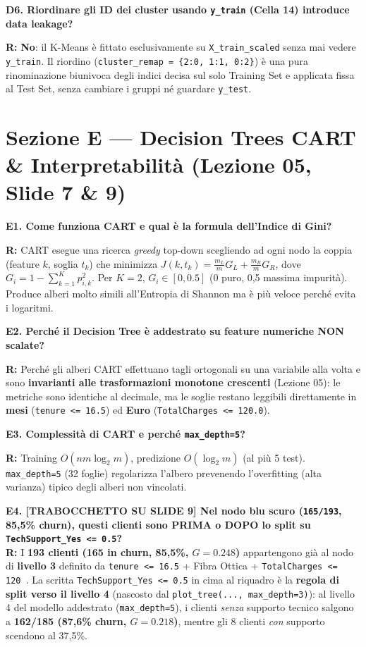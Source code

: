 \documentclass[10pt, a4paper]{article}
\newcommand{\qa}[2]{%
  \par\vspace{4pt}\noindent\textbf{\color{PrimaryNavy}#1}\par\vspace{1pt}%
  \noindent\textbf{\color{SecondaryBlue}R:} #2\par\vspace{2pt}%
}
\newcommand{\qatrap}[2]{%
  \par\vspace{4pt}\noindent\colorbox{TrapBg}{\parbox{\dimexpr\linewidth-2\fboxsep}{%
  \textbf{\color{AccentRed}#1}\\[2pt]\textbf{\color{PrimaryNavy}R:} #2}}\par\vspace{3pt}%
}
\begin{document}
\qa{D6. Riordinare gli ID dei cluster usando \texttt{y\_train} (Cella 14) introduce data leakage?}{
\textbf{No}: il K-Means è fittato esclusivamente su \texttt{X\_train\_scaled} senza mai vedere \texttt{y\_train}. Il riordino (\texttt{cluster\_remap = \{2:0, 1:1, 0:2\}}) è una pura rinominazione biunivoca degli indici decisa sul solo Training Set e applicata fissa al Test Set, senza cambiare i gruppi né guardare \texttt{y\_test}.}

\section*{Sezione E --- Decision Trees CART \& Interpretabilità (Lezione 05, Slide 7 \& 9)}

\qa{E1. Come funziona CART e qual è la formula dell'Indice di Gini?}{
CART esegue una ricerca \textit{greedy} top-down scegliendo ad ogni nodo la coppia (feature $k$, soglia $t_k$) che minimizza $J(k,t_k) = \frac{m_L}{m}G_L + \frac{m_R}{m}G_R$, dove $G_i = 1 - \sum_{k=1}^K p_{i,k}^2$. Per $K=2$, $G_i \in [0, 0.5]$ (0 puro, 0,5 massima impurità). Produce alberi molto simili all'Entropia di Shannon ma è più veloce perché evita i logaritmi.}

\qa{E2. Perché il Decision Tree è addestrato su feature numeriche NON scalate?}{
Perché gli alberi CART effettuano tagli ortogonali su una variabile alla volta e sono \textbf{invarianti alle trasformazioni monotone crescenti} (Lezione 05): le metriche sono identiche al decimale, ma le soglie restano leggibili direttamente in \textbf{mesi} (\texttt{tenure <= 16.5}) ed \textbf{Euro} (\texttt{TotalCharges <= 120.0}).}

\qa{E3. Complessità di CART e perché \texttt{max\_depth=5}?}{
Training $O(n m \log_2 m)$, predizione $O(\log_2 m)$ (al più 5 test). \texttt{max\_depth=5} (32 foglie) regolarizza l'albero prevenendo l'overfitting (alta varianza) tipico degli alberi non vincolati.}

\qatrap{E4. [TRABOCCHETTO SU SLIDE 9] Nel nodo blu scuro (\texttt{165/193}, 85,5\% churn), questi clienti sono PRIMA o DOPO lo split su \texttt{TechSupport\_Yes <= 0.5}?}{
I \textbf{193 clienti (165 in churn, 85,5\%, $G=0.248$)} appartengono già al nodo di \textbf{livello 3} definito da \texttt{tenure <= 16.5} + Fibra Ottica + \texttt{TotalCharges <= 120\,\texteuro}. La scritta \texttt{TechSupport\_Yes <= 0.5} in cima al riquadro è la \textbf{regola di split verso il livello 4} (nascosto dal \texttt{plot\_tree(..., max\_depth=3)}): al livello 4 del modello addestrato (\texttt{max\_depth=5}), i clienti \textit{senza} supporto tecnico salgono a \textbf{162/185 (87,6\% churn, $G=0.218$)}, mentre gli 8 clienti \textit{con} supporto scendono al 37,5\%.}
\end{document}
